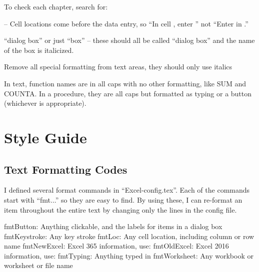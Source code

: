 \begin{enumerate}[resume]
To check each chapter, search for:

\fmtLoc -- Cell locations come before the data entry, so ``In cell , enter '' not ``Enter  in .''

``dialog box'' or just ``box'' -- these should all be called ``dialog box'' and the name of the box is italicized. 

Remove all special formatting from text areas, they should only use italics

In text, function names are in all caps with no other formatting, like SUM and COUNTA. In a procedure, they are all caps but formatted as typing or a button (whichever is appropriate).


\section{Style Guide}

\subsection{Text Formatting Codes}
I defined several format commands in ``Excel-config.tex''. Each of the commands start with ``fmt...'' so they are easy to find. By using these, I can re-format an item throughout the entire text by changing only the lines in the config file.

fmtButton: Anything clickable, and the labels for items in a dialog box
fmtKeystroke: Any key stroke
fmtLoc: Any cell location, including column or row name 
fmtNewExcel: Excel 365 information, use: 
fmtOldExcel: Excel 2016 information, use: 
fmtTyping: Anything typed in
fmtWorksheet: Any workbook or worksheet or file name




\end{enumerate}

